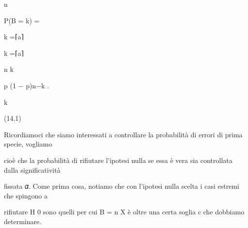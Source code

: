\documentclass[a4paper,portrait,12pt]{article}
\begin{document}
\begin{flushleft}
n
\end{flushleft}





\begin{flushleft}
P(B = k) =
\end{flushleft}


\begin{flushleft}
k =⌈a⌉
\end{flushleft}





\begin{flushleft}
k =⌈a⌉
\end{flushleft}





\begin{flushleft}
n k
\end{flushleft}


\begin{flushleft}
p (1 $-$ p)n$-$k .
\end{flushleft}


\begin{flushleft}
k
\end{flushleft}





(14.1)





\begin{flushleft}
Ricordiamoci che siamo interessati a controllare la probabilit\`{a} di errori di prima specie, vogliamo
\end{flushleft}


\begin{flushleft}
cio\`{e} che la probabilit\`{a} di rifiutare l'ipotesi nulla se essa \`{e} vera sia controllata dalla significativit\`{a}
\end{flushleft}


\begin{flushleft}
fissata 𝛼. Come prima cosa, notiamo che con l'ipotesi nulla scelta i casi estremi che spingono a
\end{flushleft}


\begin{flushleft}
rifiutare H 0 sono quelli per cui B = n X \`{e} oltre una certa soglia c che dobbiamo determinare.
\end{flushleft}
\end{document}
